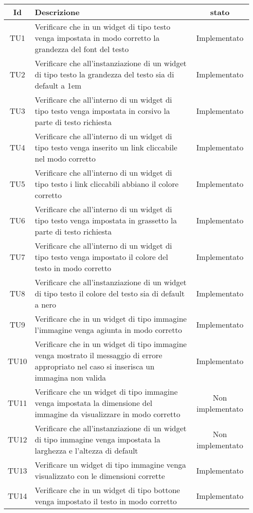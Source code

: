 \begin{center}
	\begin{longtable}{|c|>{\centering}m{10cm}|c|}\hline
		Id & Descrizione & stato \\ \hline
		TU1 & Verificare che in un widget di tipo testo venga impostata in modo corretto la grandezza del font del testo & Implementato \\ \hline
		TU2 & Verificare che all'instanziazione di un widget di tipo testo la grandezza del testo sia di default a 1em & Implementato \\ \hline
		TU3 & Verificare che all'interno di un widget di tipo testo venga impostata in corsivo la parte di testo richiesta & Implementato \\ \hline
		TU4 & Verificare che all'interno di un widget di tipo testo venga inserito un link cliccabile nel modo corretto & Implementato \\ \hline
		TU5 & Verificare che all'interno di un widget di tipo testo i link cliccabili abbiano il colore corretto & Implementato \\ \hline
		TU6 & Verificare che all'interno di un widget di tipo testo venga impostata in grassetto la parte di testo richiesta & Implementato \\ \hline
		TU7 & Verificare che all'interno di un widget di tipo testo venga impostato il colore del testo in modo corretto & Implementato \\ \hline
		TU8 & Verificare che all'instanziazione di un widget di tipo testo il colore del testo sia di default a nero & Implementato \\ \hline
		TU9 & Verificare che in un widget di tipo immagine l'immagine venga agiunta in modo corretto & Implementato \\ \hline
		TU10 & Verificare che in un widget di tipo immagine venga mostrato il messaggio di errore appropriato nel caso si inserisca un immagina non valida & Implementato \\ \hline
		TU11 & Verificare che un widget di tipo immagine venga impostata la dimensione del immagine da visualizzare in modo corretto & Non implementato \\ \hline
		TU12 & Verificare che all'instanziazione di un widget di tipo immagine venga impostata la larghezza e l'altezza di default & Non implementato \\ \hline
		TU13 & Verificare un widget di tipo immagine venga visualizzato con le dimensioni corrette & Implementato \\ \hline
		TU14 & Verificare che in un widget di tipo bottone venga impostato il testo in modo corretto & Implementato \\ \hline

\end{longtable}
\end{center}
